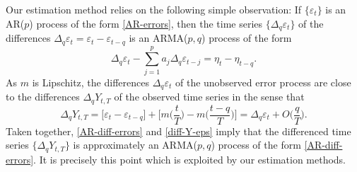 Our estimation method relies on the following simple observation: If $\{\varepsilon_t\}$ is an AR($p$) process of the form \eqref{AR-errors}, then the time series $\{ \Delta_q \varepsilon_t \}$ of the differences $\Delta_q \varepsilon_t = \varepsilon_t - \varepsilon_{t-q}$ is an ARMA($p,q$) process of the form 
\begin{equation}\label{AR-diff-errors} 
\Delta_q \varepsilon_t - \sum_{j=1}^p a_j \Delta_q \varepsilon_{t-j} = \eta_t - \eta_{t-q}. 
\end{equation}
As $m$ is Lipschitz, the differences $\Delta_q \varepsilon_t$ of the unobserved error process are close to the differences $\Delta_q Y_{t,T}$ of the observed time series in the sense that 
\begin{equation}\label{diff-Y-eps}
\Delta_q Y_{t,T} = \big[\varepsilon_t  - \varepsilon_{t-q} \big] + \Big[ m \Big(\frac{t}{T}\Big) - m \Big(\frac{t-q}{T}\Big) \Big] = \Delta_q \varepsilon_t + O \Big( \frac{q}{T} \Big).  
\end{equation} 
Taken together, \eqref{AR-diff-errors} and \eqref{diff-Y-eps} imply that the differenced time series $\{ \Delta_q Y_{t,T} \}$ is approximately an ARMA($p,q$) process of the form \eqref{AR-diff-errors}. It is precisely this point which is exploited by our estimation methods. 


